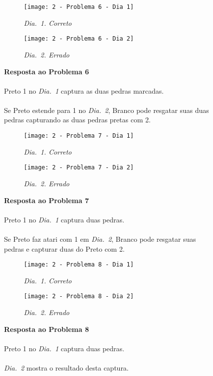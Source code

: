 \vfill

\begin{SCfigure}[][h!]
    \begin{subfigure}[t]{.31\textwidth}
        \texttt{[image: 2 - Problema 6 - Dia 1]}
        \caption*{\emph{Dia.\@~1. Correto}}
    \end{subfigure}
    \hfill
    \begin{subfigure}[t]{.31\textwidth}
        \texttt{[image: 2 - Problema 6 - Dia 2]}
        \caption*{\emph{Dia.\@~2. Errado}}
    \end{subfigure}
    \hfill
    \caption*{\textbf{Resposta ao Problema 6}\\\\Preto 1 no \emph{Dia.\@~1} captura as duas pedras marcadas.\\\\Se Preto estende para 1 no \emph{Dia.\@~2}, Branco pode resgatar suas duas pedras capturando as duas pedras pretas com 2.}
\end{SCfigure}

\pagebreak

\begin{SCfigure}[][h!]
    \begin{subfigure}[t]{.31\textwidth}
        \texttt{[image: 2 - Problema 7 - Dia 1]}
        \caption*{\emph{Dia.\@~1. Correto}}
    \end{subfigure}
    \hfill
    \begin{subfigure}[t]{.31\textwidth}
        \texttt{[image: 2 - Problema 7 - Dia 2]}
        \caption*{\emph{Dia.\@~2. Errado}}
    \end{subfigure}
    \hfill
    \caption*{\textbf{Resposta ao Problema 7}\\\\Preto 1 no \emph{Dia.\@~1} captura duas pedras.\\\\Se Preto faz atari com 1 em \emph{Dia.\@~2}, Branco pode resgatar suas pedras e capturar duas do Preto com 2.}
\end{SCfigure}

\vfill

\begin{SCfigure}[][h!]
    \begin{subfigure}[t]{.31\textwidth}
        \texttt{[image: 2 - Problema 8 - Dia 1]}
        \caption*{\emph{Dia.\@~1. Correto}}
    \end{subfigure}
    \hfill
    \begin{subfigure}[t]{.31\textwidth}
        \texttt{[image: 2 - Problema 8 - Dia 2]}
        \caption*{\emph{Dia.\@~2. Errado}}
    \end{subfigure}
    \hfill
    \caption*{\textbf{Resposta ao Problema 8}\\\\Preto 1 no \emph{Dia.\@~1} captura duas pedras.\\\\\emph{Dia.\@~2} mostra o resultado desta captura.}
\end{SCfigure}

